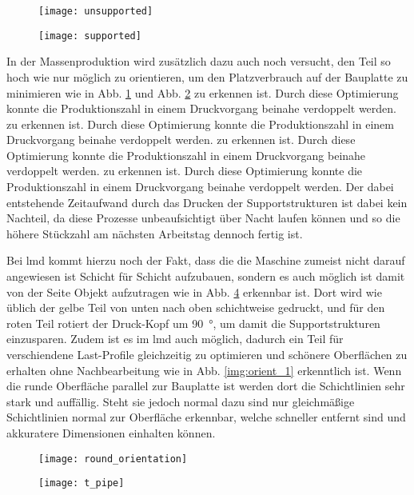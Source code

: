 \documentclass[../main.tex]{subfiles}
\begin{document}
\begin{figure}[H]
	\centering
	\texttt{[image: unsupported]}
	\label{img:unsupp_1}
\end{figure}
\begin{figure}[H]
	\centering
	\texttt{[image: supported]}
	\label{img:supp_1}
\end{figure}
In der Massenproduktion wird zusätzlich dazu auch noch versucht, den Teil so hoch wie nur möglich zu orientieren, um den Platzverbrauch auf der Bauplatte zu minimieren wie in Abb. \ref{img:unsupp_1} und Abb. \ref{img:supp_1} zu erkennen ist. Durch diese Optimierung konnte die Produktionszahl in einem Druckvorgang beinahe verdoppelt werden.  zu erkennen ist. Durch diese Optimierung konnte die Produktionszahl in einem Druckvorgang beinahe verdoppelt werden.  zu erkennen ist. Durch diese Optimierung konnte die Produktionszahl in einem Druckvorgang beinahe verdoppelt werden.  zu erkennen ist. Durch diese Optimierung konnte die Produktionszahl in einem Druckvorgang beinahe verdoppelt werden. Der dabei entstehende Zeitaufwand durch das Drucken der Supportstrukturen ist dabei kein Nachteil, da diese Prozesse unbeaufsichtigt über Nacht laufen können und so die höhere Stückzahl am nächsten Arbeitstag dennoch fertig ist.

Bei \acrfull{lmd} kommt hierzu noch der Fakt, dass die die Maschine zumeist nicht darauf angewiesen ist Schicht für Schicht aufzubauen, sondern es auch möglich ist damit von der Seite Objekt aufzutragen wie in Abb. \ref{img:t_pipe} erkennbar ist. Dort wird wie üblich der gelbe Teil von unten nach oben schichtweise gedruckt, und für den roten Teil rotiert der Druck-Kopf um \qty{90}{\degree}, um damit die Supportstrukturen einzusparen. Zudem ist es im \acrshort{lmd} auch möglich, dadurch ein Teil für verschiendene Last-Profile gleichzeitig zu optimieren und schönere Oberflächen zu erhalten ohne Nachbearbeitung wie in Abb. \ref{img:orient_1} erkenntlich ist. Wenn die runde Oberfläche parallel zur Bauplatte ist werden dort die Schichtlinien sehr stark und auffällig. Steht sie jedoch normal dazu sind nur gleichmäßige Schichtlinien normal zur Oberfläche erkennbar, welche schneller entfernt sind und akkuratere Dimensionen einhalten können.
\begin{figure}[H]
	\centering
	\texttt{[image: round\_orientation]}

	\label{img:round_orient}
\end{figure}
\begin{figure}[H]
	\centering
	\texttt{[image: t\_pipe]}
	\label{img:t_pipe}
\end{figure}
\end{document}
